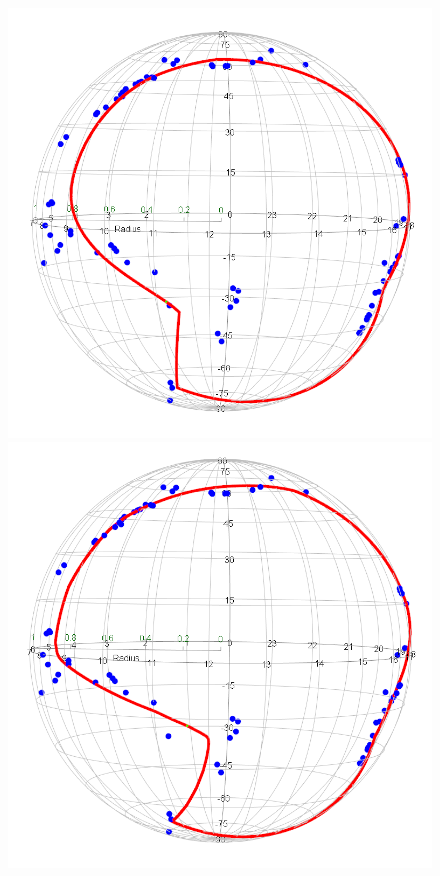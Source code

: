 \begin{figure}[h]
    \centering
    \includegraphics[scale=0.255]{figures/SPC(earthquake)q=015.png}
    \hspace{0.8cm}
    \includegraphics[scale=0.255]{figures/SPC(earthquake)q=01.png}

\end{figure}
